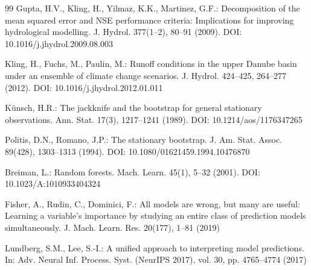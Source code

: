 \documentclass[pdflatex,sn-mathphys,Numbered]{sn-jnl}
\begin{document}
\begin{thebibliography}{99}
Gupta, H.V., Kling, H., Yilmaz, K.K., Martinez, G.F.: Decomposition of the mean squared error and NSE performance criteria: Implications for improving hydrological modelling. J. Hydrol. 377(1--2), 80--91 (2009). DOI: 10.1016/j.jhydrol.2009.08.003

Kling, H., Fuchs, M., Paulin, M.: Runoff conditions in the upper Danube basin under an ensemble of climate change scenarios. J. Hydrol. 424--425, 264--277 (2012). DOI: 10.1016/j.jhydrol.2012.01.011

K{\"u}nsch, H.R.: The jackknife and the bootstrap for general stationary observations. Ann. Stat. 17(3), 1217--1241 (1989). DOI: 10.1214/aos/1176347265

Politis, D.N., Romano, J.P.: The stationary bootstrap. J. Am. Stat. Assoc. 89(428), 1303--1313 (1994). DOI: 10.1080/01621459.1994.10476870

Breiman, L.: Random forests. Mach. Learn. 45(1), 5--32 (2001). DOI: 10.1023/A:1010933404324

Fisher, A., Rudin, C., Dominici, F.: All models are wrong, but many are useful: Learning a variable's importance by studying an entire class of prediction models simultaneously. J. Mach. Learn. Res. 20(177), 1--81 (2019)

Lundberg, S.M., Lee, S.-I.: A unified approach to interpreting model predictions. In: Adv. Neural Inf. Process. Syst. (NeurIPS 2017), vol. 30, pp. 4765--4774 (2017)

\end{thebibliography}
\end{document}
